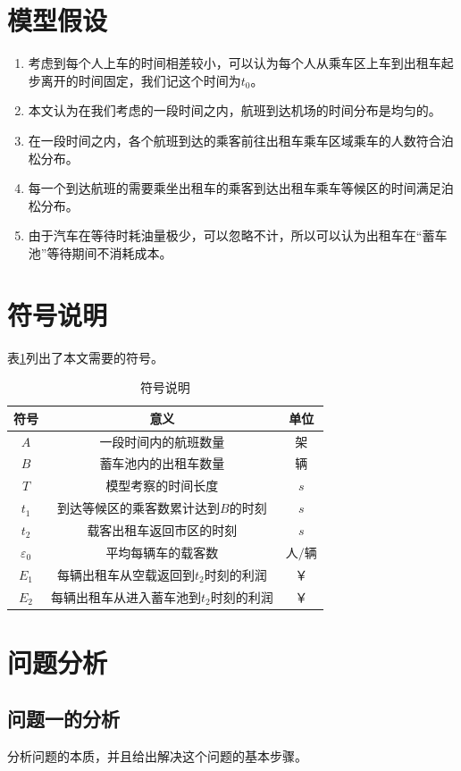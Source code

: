 \documentclass{cumcm}
\begin{document}
\section{模型假设}
\begin{enumerate}
	\item 考虑到每个人上车的时间相差较小，可以认为每个人从乘车区上车到出租车起步离开的时间固定，我们记这个时间为$t_0$。
	\item 本文认为在我们考虑的一段时间之内，航班到达机场的时间分布是均匀的。
	\item 在一段时间之内，各个航班到达的乘客前往出租车乘车区域乘车的人数符合泊松分布。
	\item 每一个到达航班的需要乘坐出租车的乘客到达出租车乘车等候区的时间满足泊松分布。
	\item 由于汽车在等待时耗油量极少，可以忽略不计，所以可以认为出租车在“蓄车池”等待期间不消耗成本。
\end{enumerate}
\section{符号说明}
表\ref{table-symbol}列出了本文需要的符号。
\begin{table}[H]
	\centering
	\caption{符号说明} 
	\label{table-symbol}
	\begin{tabular*}{0.62\textwidth}{ccc}
		\toprule
		符号 & 意义 & 单位 \\
		\midrule
		$A$ & 一段时间内的航班数量 & 架 \\
		$B$ & 蓄车池内的出租车数量 & 辆 \\
		$T$ & 模型考察的时间长度 & $s$ \\
		$t_1$ & 到达等候区的乘客数累计达到$B$的时刻 & $s$ \\
		$t_2$ & 载客出租车返回市区的时刻 & $s$ \\
		$\varepsilon_0$ & 平均每辆车的载客数 & 人$/$辆 \\
		$E_1$ & 每辆出租车从空载返回到$t_2$时刻的利润 & ￥ \\
		$E_2$ & 每辆出租车从进入蓄车池到$t_2$时刻的利润 & ￥ \\

		\bottomrule
	\end{tabular*}
\end{table}

\section{问题分析}
\subsection{问题一的分析}
分析问题的本质，并且给出解决这个问题的基本步骤。
\end{document}
